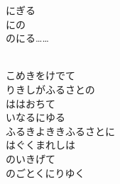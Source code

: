 \documentclass[10pt,b5j]{tarticle} %
\begin{document}
\vspace{1.5em} %
\newcommand{\linespace}{0.5em} %
\newcommand{\blocksize}{0.5\hsize} %
\newcommand{\itemmargin}{3em} %
にぎる\\
にの\\
のにる……
\begin{enumerate} %
    \setlength{\itemindent}{\itemmargin} %
    \begin{minipage}[c]{\blocksize}
        
        \vspace{\linespace}
        \item~\\
        こめきをけでて\\
        りきしがふるさとの\\
        ははおちて\\
        いなるにゆる\\
        ふるきよききふるさとに\\
        はぐくまれしは\\
        のいきげて\\
        のごとくにりゆく
        
    \end{minipage}
    \begin{minipage}[c]{\blocksize}
        

\end{minipage}
\end{enumerate}
\end{document}
